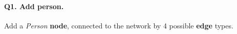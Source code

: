 \paragraph{\textbf{Q1}. Add person.}
Add a \emph{Person} \textbf{node}, connected to the network by 4
possible \textbf{edge} types.
